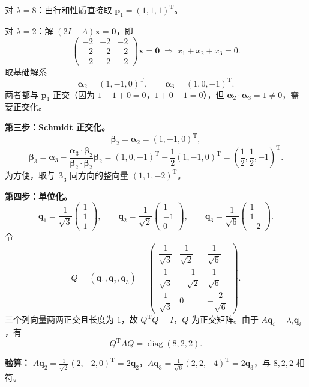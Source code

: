 对 \(\lambda=8\)：由行和性质直接取 \(\mathbf{p}_1=(1,1,1)^{\mathrm{T}}\)。

对 \(\lambda=2\)：解 \((2I-A)\mathbf{x}=\mathbf{0}\)，即
\[
\begin{pmatrix}-2&-2&-2\\-2&-2&-2\\-2&-2&-2\end{pmatrix}\mathbf{x}=\mathbf{0}
\;\Longrightarrow\;
x_1+x_2+x_3=0.
\]
取基础解系
\[
\boldsymbol{\alpha}_2=(1,-1,0)^{\mathrm{T}},\qquad
\boldsymbol{\alpha}_3=(1,0,-1)^{\mathrm{T}}.
\]
两者都与 \(\mathbf{p}_1\) 正交（因为 \(1-1+0=0\)，\(1+0-1=0\)），但 \(\boldsymbol{\alpha}_2\cdot\boldsymbol{\alpha}_3=1\neq0\)，需要正交化。

\textbf{第三步：Schmidt 正交化。}
\[
\boldsymbol{\beta}_2=\boldsymbol{\alpha}_2=(1,-1,0)^{\mathrm{T}},
\]
\[
\boldsymbol{\beta}_3=\boldsymbol{\alpha}_3-\frac{\boldsymbol{\alpha}_3\cdot\boldsymbol{\beta}_2}{\boldsymbol{\beta}_2\cdot\boldsymbol{\beta}_2}\boldsymbol{\beta}_2
=(1,0,-1)^{\mathrm{T}}-\frac12(1,-1,0)^{\mathrm{T}}
=\left(\frac12,\frac12,-1\right)^{\mathrm{T}}.
\]
为方便，取与 \(\boldsymbol{\beta}_3\) 同方向的整向量 \((1,1,-2)^{\mathrm{T}}\)。

\textbf{第四步：单位化。}
\[
\mathbf{q}_1=\frac{1}{\sqrt3}\begin{pmatrix}1\\1\\1\end{pmatrix},\qquad
\mathbf{q}_2=\frac{1}{\sqrt2}\begin{pmatrix}1\\-1\\0\end{pmatrix},\qquad
\mathbf{q}_3=\frac{1}{\sqrt6}\begin{pmatrix}1\\1\\-2\end{pmatrix}.
\]
令
\[
Q=(\mathbf{q}_1,\mathbf{q}_2,\mathbf{q}_3)=
\begin{pmatrix}
\dfrac{1}{\sqrt3}&\dfrac{1}{\sqrt2}&\dfrac{1}{\sqrt6}\\[6pt]
\dfrac{1}{\sqrt3}&-\dfrac{1}{\sqrt2}&\dfrac{1}{\sqrt6}\\[6pt]
\dfrac{1}{\sqrt3}&0&-\dfrac{2}{\sqrt6}
\end{pmatrix}.
\]
三个列向量两两正交且长度为 \(1\)，故 \(Q^{\mathrm{T}}Q=I\)，\(Q\) 为正交矩阵。由于 \(A\mathbf{q}_i=\lambda_i\mathbf{q}_i\)，有
\[
Q^{\mathrm{T}}AQ=\operatorname{diag}(8,2,2).
\]

\textbf{验算：} \(A\mathbf{q}_2=\frac{1}{\sqrt2}(2,-2,0)^{\mathrm{T}}=2\mathbf{q}_2\)，\(A\mathbf{q}_3=\frac{1}{\sqrt6}(2,2,-4)^{\mathrm{T}}=2\mathbf{q}_3\)，与 \(8,2,2\) 相符。

